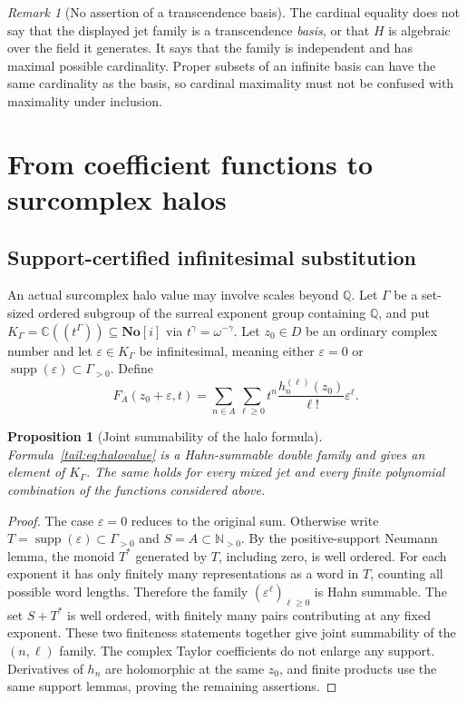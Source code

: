 \documentclass[11pt,a4paper]{article}
\numberwithin{equation}{section}
\newtheorem{proposition}[theorem]{Proposition}
\theoremstyle{definition}
\theoremstyle{remark}
\newtheorem{remark}[theorem]{Remark}
\newcommand{\No}{\mathbf{No}}
\newcommand{\C}{\mathbb C}
\newcommand{\Q}{\mathbb Q}
\newcommand{\N}{\mathbb N}
\newcommand{\supp}{\operatorname{supp}}
\begin{document}
\begin{remark}[No assertion of a transcendence basis]
The cardinal equality does not say that the displayed jet family is a
transcendence \emph{basis}, or that $H$ is algebraic over the field it
generates. It says that the family is independent and has maximal possible
cardinality. Proper subsets of an infinite basis can have the same
cardinality as the basis, so cardinal maximality must not be confused
with maximality under inclusion.
\end{remark}

\section{From coefficient functions to surcomplex halos}\label{tail:sec:halos}

\subsection{Support-certified infinitesimal substitution}
An actual surcomplex halo value may involve scales beyond $\Q$. Let
$\Gamma$ be a set-sized ordered subgroup of the surreal exponent group
containing $\Q$, and put $K_\Gamma=\C((t^\Gamma))\subseteq\No[i]$ via
$t^\gamma=\omega^{-\gamma}$. Let $z_0\in D$ be an ordinary complex
number and let $\varepsilon\in K_\Gamma$ be infinitesimal, meaning either
$\varepsilon=0$ or $\supp(\varepsilon)\subset\Gamma_{>0}$.
Define
\begin{equation}\label{tail:eq:halovalue}
 F_A(z_0+\varepsilon,t)
  =\sum_{n\in A}\sum_{\ell\geq0}
       t^n\frac{h_n^{(\ell)}(z_0)}{\ell!}\varepsilon^\ell.
\end{equation}

\begin{proposition}[Joint summability of the halo formula]\label{tail:prop:halo}
Formula~\eqref{tail:eq:halovalue} is a Hahn-summable double family and gives
an element of $K_\Gamma$. The same holds for every mixed jet and every
finite polynomial combination of the functions considered above.
\end{proposition}
\begin{proof}
The case $\varepsilon=0$ reduces to the original sum. Otherwise write
$T=\supp(\varepsilon)\subset\Gamma_{>0}$ and $S=A\subset\N_{>0}$.
By the positive-support Neumann lemma, the monoid $T^*$ generated by
$T$, including zero, is well ordered. For each exponent it has only
finitely many representations as a word in $T$, counting all possible
word lengths. Therefore the family $(\varepsilon^\ell)_{\ell\geq0}$
is Hahn summable. The set $S+T^*$ is well ordered, with finitely many
pairs contributing at any fixed exponent. These two finiteness
statements together give joint summability of the $(n,\ell)$ family.
The complex Taylor coefficients do not enlarge any support. Derivatives
of $h_n$ are holomorphic at the same $z_0$, and finite products use the
same support lemmas, proving the remaining assertions.
\end{proof}
\end{document}
